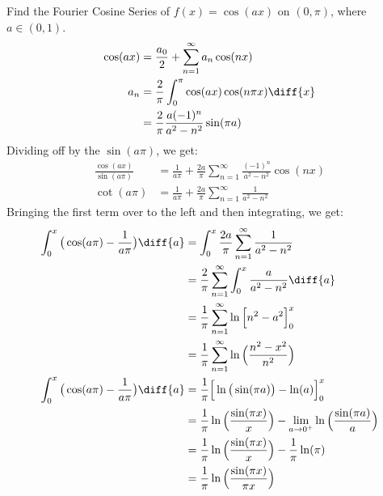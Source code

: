             Find the Fourier Cosine Series of $f(x)=\cos(ax)$ on
            $(0,\pi)$, where $a\in(0,1)$.
            \begin{align}
                \cos(ax)&=\frac{a_{0}}{2}+
                    \sum_{n=1}^{\infty}a_{n}\cos(nx)\\
                a_{n}&=\frac{2}{\pi}
                    \int_{0}^{\pi}\cos(ax)\cos(n\pi{x})\diff{x}\\
                    &=\frac{2}{\pi}
                        \frac{a(-1)^{n}}{a^{2}-n^{2}}\sin(\pi{a})
            \end{align}
            Dividing off by the $\sin(a\pi)$, we get:
            \begin{align}
                \frac{\cos(ax)}{\sin(a\pi)}
                &=\frac{1}{a\pi}+\frac{2a}{\pi}
                    \sum_{n=1}^{\infty}\frac{(-1)^{n}}{a^{2}-n^{2}}
                    \cos(nx)\\
                \cot(a\pi)&=
                    \frac{1}{a\pi}+\frac{2a}{\pi}
                    \sum_{n=1}^{\infty}\frac{1}{a^{2}-n^{2}}
            \end{align}
            Bringing the first term over to the left and then integrating,
            we get:
            \begin{align}
                \int_{0}^{x}\big(\cos(a\pi)-\frac{1}{a\pi}\big)\diff{a}
                &=\int_{0}^{x}\frac{2a}{\pi}\sum_{n=1}^{\infty}
                    \frac{1}{a^{2}-n^{2}}\\
                &=\frac{2}{\pi}\sum_{n=1}^{\infty}\int_{0}^{x}
                    \frac{a}{a^{2}-n^{2}}\diff{a}\\
                &=\frac{1}{\pi}\sum_{n=1}^{\infty}
                    \ln\Big[n^{2}-a^{2}\Big]_{0}^{x}\\
                &=\frac{1}{\pi}\sum_{n=1}^{\infty}
                    \ln\Big(\frac{n^{2}-x^{2}}{n^{2}}\Big)\\
                \int_{0}^{x}\big(\cos(a\pi)-\frac{1}{a\pi}\big)\diff{a}
                &=\frac{1}{\pi}\Big[
                    \ln\big(\sin(\pi{a})\big)-\ln(a)
                \Big]_{0}^{x}\\
                &=\frac{1}{\pi}\ln\Big(\frac{\sin(\pi{x})}{x}\Big)-
                    \underset{a\rightarrow{0}^{+}}{\lim}
                    \ln\Big(\frac{\sin(\pi{a})}{a}\Big)\\
                &=\frac{1}{\pi}\ln\Big(\frac{\sin(\pi{x})}{x}\Big)-
                    \frac{1}{\pi}\ln(\pi)\\
                &=\frac{1}{\pi}\ln\Big(\frac{\sin(\pi{x})}{\pi{x}}\Big)
            \end{align}
